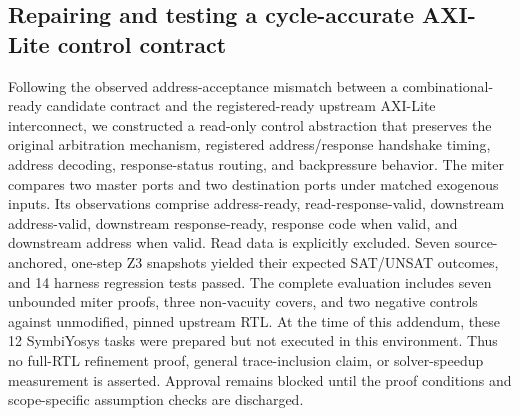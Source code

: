 \subsection{Repairing and testing a cycle-accurate AXI-Lite control contract}
Following the observed address-acceptance mismatch between a combinational-ready
candidate contract and the registered-ready upstream AXI-Lite interconnect,
we constructed a read-only control abstraction that preserves the original
arbitration mechanism, registered address/response handshake timing,
address decoding, response-status routing, and backpressure behavior.
The miter compares two master ports and two destination ports under matched
exogenous inputs. Its observations comprise address-ready, read-response-valid,
downstream address-valid, downstream response-ready, response code when valid,
and downstream address when valid. Read data is explicitly excluded.
Seven source-anchored, one-step Z3 snapshots yielded their expected SAT/UNSAT
outcomes, and 14 harness regression tests passed. The complete evaluation
includes seven unbounded miter proofs, three non-vacuity covers, and two
negative controls against unmodified, pinned upstream RTL. At the time of
this addendum, these 12 SymbiYosys tasks were prepared but not executed in
this environment. Thus no full-RTL refinement proof, general trace-inclusion
claim, or solver-speedup measurement is asserted. Approval remains blocked
until the proof conditions and scope-specific assumption checks are discharged.
